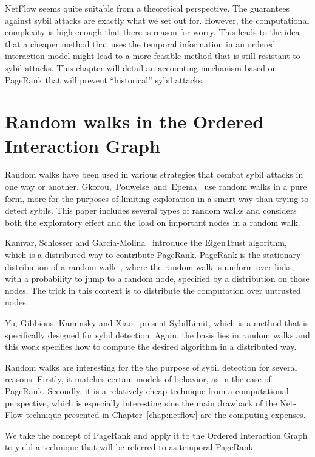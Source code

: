 \documentclass[a4paper,11pt]{book}
\theoremstyle{definition}
\begin{document}
NetFlow seems quite suitable from a theoretical perspective. The guarantees against sybil 
attacks are exactly what we set out for. However, the computational complexity is high
enough that there is reason for worry. This leads to the idea that a cheaper method that uses
the temporal information in an ordered interaction model might lead to a more feasible method
that is still resistant to sybil attacks. This chapter will detail an accounting mechanism
based on PageRank that will prevent ``historical'' sybil attacks.


\section{Random walks in the Ordered Interaction Graph}

Random walks have been used in various strategies that combat sybil attacks
in one way or another. Gkorou,~Pouwelse~and~Epema~\cite{gkorou2015trust} use random walks
in a pure form, more for the purposes of limiting exploration in
a smart way than trying to detect sybils. This paper includes several types
of random walks and considers both the exploratory effect and the
load on important nodes in a random walk.

Kamvar, Schlosser and Garcia-Molina~\cite{kamvar2003eigentrust} introduce
the EigenTrust algorithm, which is a distributed way to contribute PageRank.
PageRank is the stationary distribution of a random walk~\cite{page1999pagerank},
where the random walk is uniform over links, with a probability to jump to a
random node, specified by a distribution on those nodes. The trick in this context
is to distribute the computation over untrusted nodes. 

Yu, Gibbions, Kaminsky and Xiao~\cite{yu2008sybillimit} present SybilLimit, which
is a method that is specifically designed for sybil detection. Again, the basis
lies in random walks and this work specifies how to compute the desired
algorithm in a distributed way.

Random walks are interesting for the the purpose of sybil detection for several reasons.
Firstly, it matches certain models of behavior, as in the case of PageRank. Secondly, it 
is a relatively cheap technique from a computational perspective, which is especially
interesting sine the main
drawback of the Net-Flow technique presented in Chapter~\ref{chap:netflow} 
are the computing expenses.

We take the concept of PageRank and apply it to the Ordered Interaction Graph to
yield a technique that will be referred to as temporal PageRank
\end{document}
